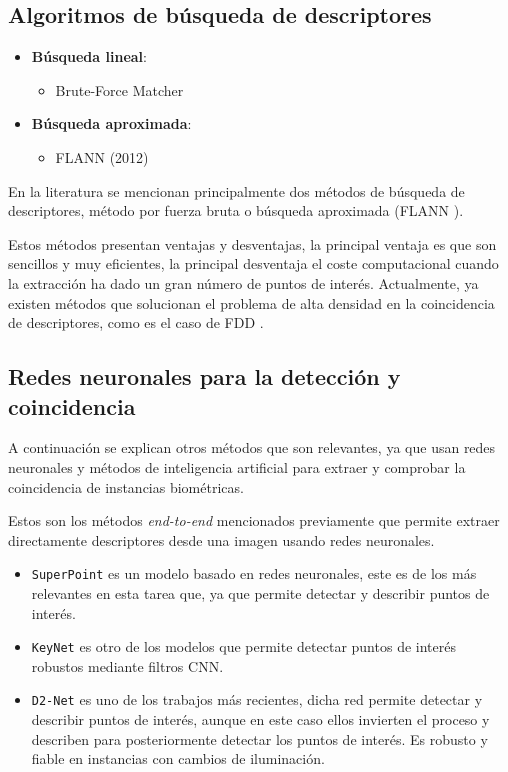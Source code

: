 \subsection{Algoritmos de búsqueda de descriptores}
\begin{itemize}
    \item \textbf{Búsqueda lineal}: 
    \begin{itemize}
        \item Brute-Force Matcher \cite{bf-and-flann-matcher}
    \end{itemize}
    
    \item \textbf{Búsqueda aproximada}: 
    \begin{itemize}
        \item FLANN (2012) \cite{bf-and-flann-matcher,10.5555/2354409.2355123}
    \end{itemize}
\end{itemize}

En la literatura se mencionan principalmente dos métodos de búsqueda de descriptores, método por fuerza bruta o búsqueda aproximada (FLANN \cite{bf-and-flann-matcher,10.5555/2354409.2355123}).

Estos métodos presentan ventajas y desventajas, la principal ventaja es que son sencillos y muy eficientes, la principal desventaja el coste computacional cuando la extracción ha dado un gran número de puntos de interés. Actualmente, ya existen métodos que solucionan el problema de alta densidad en la coincidencia de descriptores, como es el caso de \acrshort{FDD} \cite{FDD-pan2024fixedlengthdensedescriptorefficient}.

\subsection{Redes neuronales para la detección y coincidencia}
A continuación se explican otros métodos que son relevantes, ya que usan redes neuronales y métodos de inteligencia artificial para extraer y comprobar la coincidencia de instancias biométricas.

Estos son los métodos \textit{end-to-end} mencionados previamente que permite extraer directamente descriptores desde una imagen usando redes neuronales.

\begin{itemize}
    \item \texttt{SuperPoint} \cite{detone18superpoint} es un modelo basado en redes neuronales, este es de los más relevantes en esta tarea que, ya que permite detectar y describir puntos de interés.
    \item \texttt{KeyNet} \cite{Barroso-Laguna2019ICCV} es otro de los modelos que permite detectar puntos de interés robustos mediante filtros \gls{CNN}.
    \item \texttt{D2-Net} \cite{D2-Net-Dusmanu2019CVPR} es uno de los trabajos más recientes, dicha red permite detectar y describir puntos de interés, aunque en este caso ellos invierten el proceso y describen para posteriormente detectar los puntos de interés. Es robusto y fiable en instancias con cambios de iluminación.
\end{itemize}


